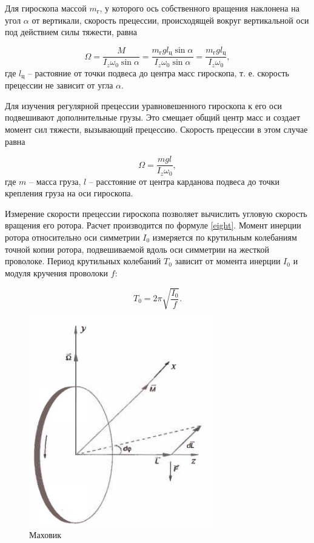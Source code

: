 \documentclass[a4paper, 12pt]{article}
\begin{document}
\begin{center}
Для гироскопа массой $ m_\text{г} $, у которого ось собственного вращения наклонена на угол $ \alpha $ от вертикали, скорость прецессии, происходящей вокруг вертикальной оси под действием силы тяжести, равна

\begin{equation}
\Omega = \frac{M}{I_z\omega_0\sin \alpha} = \frac{m_\text{г}gl_\text{ц}\sin\alpha}{I_z\omega_0\sin\alpha} = \frac{m_\text{г}gl_\text{ц}}{I_z\omega_0},
\end{equation}
где $ l_\text{ц} $ -- растояние от точки подвеса до центра масс гироскопа, т. е. скорость прецессии не зависит от угла $ \alpha $.

Для изучения регулярной прецессии уравновешенного гироскопа к его оси подвешивают дополнительные грузы. Это смещает общий центр масс и создает момент сил тяжести, вызывающий прецессию. Скорость прецессии в этом случае равна

\begin{equation}
\Omega = \frac{mgl}{I_z\omega_0},
\label{eight}
\end{equation}
где $ m $ -- масса груза, $ l $ -- расстояние от центра карданова подвеса до точки крепления груза на оси гироскопа.

Измерение скорости прецессии гироскопа позволяет вычислить угловую скорость вращения его ротора. Расчет производится по формуле \eqref{eight}. Момент инерции ротора относительно оси симметрии $ I_0 $ измеряется по крутильным колебаниям точной копии ротора, подвешиваемой вдоль оси симметрии на жесткой проволоке. Период крутильных колебаний $ T_0 $ зависит от момента инерции $ I_0 $ и модуля кручения проволоки $ f $:

    \begin{equation}
        T_0 = 2\pi\sqrt{\frac{I_0}{f}}.
        \label{nine}
    \end{equation}


    \begin{figure}
    	\centering\includegraphics[width=8cm]{mahovik.png}
    	\caption{Маховик}
    	\label{mahovik}
    \end{figure}
    

\end{center}
\end{document}
